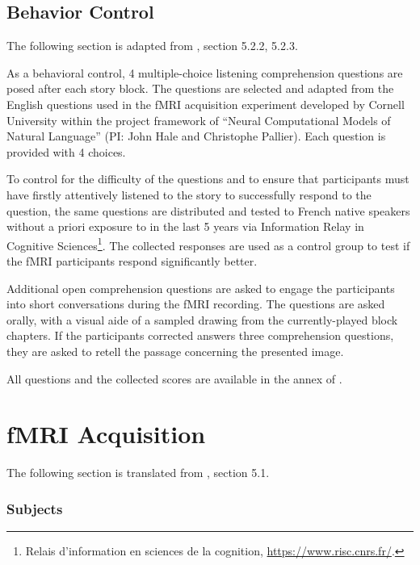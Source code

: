 \subsection{Behavior Control}
The following section is adapted from \textcite{todorovicAnalysesIRMfLors2018}, section 5.2.2, 5.2.3.

As a behavioral control, 4 multiple-choice listening comprehension questions are posed after each story block. The questions are selected and adapted from the English questions used in the fMRI acquisition experiment developed by Cornell University within the project framework of ``Neural Computational Models of Natural Language'' (PI: John Hale and Christophe Pallier). Each question is provided with 4 choices. 

To control for the difficulty of the questions and to ensure that participants must have firstly attentively listened to the story to successfully respond to the question, the same questions are distributed and tested to French native speakers without a priori exposure to  in the last 5 years via Information Relay in Cognitive Sciences\footnote{Relais d'information en sciences de la cognition, \url{https://www.risc.cnrs.fr/}.}. The collected responses are used as a control group to test if the fMRI participants respond significantly better.

Additional open comprehension questions are asked to engage the participants into short conversations during the fMRI recording. The questions are asked orally, with a visual aide of a sampled drawing from the currently-played block chapters. If the participants corrected answers three comprehension questions, they are asked to retell the passage concerning the presented image. 

All questions and the collected scores are available in the annex of \textcite{todorovicAnalysesIRMfLors2018}.

\section{fMRI Acquisition}
\label{appsec:fmriacquisition} %
\label{appsubsec:fmridata}

The following section is translated from \textcite{todorovicAnalysesIRMfLors2018}, section 5.1.
\subsubsection{Subjects}

